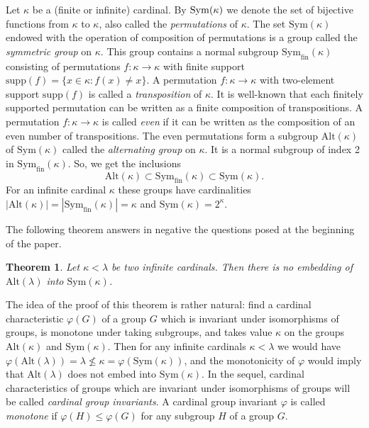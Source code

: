 \documentclass[11pt, twoside]{amsart}
\newtheorem{theorem}{Theorem}
\theoremstyle{definition}
\begin{document}
Let $\kappa$ be a (finite or infinite) cardinal. By ${\rm Sym}(\kappa)$ we denote the set of
bijective functions from $\kappa$ to $\kappa$,
also called the {\em permutations} of $\kappa$.  The set ${\mathrm{Sym}}(\kappa)$ endowed with the operation of composition of permutations is a group called the {\em symmetric group} on $\kappa$. This group contains a normal subgroup ${\mathrm{Sym}}_{\mathrm{fin}}(\kappa)$ consisting of permutations $f:\kappa\to\kappa$ with finite support ${\mathrm{supp}}(f)=\{x\in\kappa:f(x)\ne x\}$. A permutation $f:\kappa\to\kappa$ with two-element support ${\mathrm{supp}}(f)$ is called a {\em transposition} of $\kappa$. It is well-known that each finitely supported permutation can be written as a finite composition of transpositions. A permutation $f:\kappa\to\kappa$ is called {\em even} if it can be written as the composition of an even number of transpositions. The even permutations form a subgroup ${\mathrm{Alt}}(\kappa)$ of ${\mathrm{Sym}}(\kappa)$ called the {\em alternating group} on $\kappa$. It is a normal subgroup of index 2 in ${\mathrm{Sym}}_{\mathrm{fin}}(\kappa)$. So, we get the inclusions $${\mathrm{Alt}}(\kappa)\subset{\mathrm{Sym}}_{\mathrm{fin}}(\kappa)\subset{\mathrm{Sym}}(\kappa).$$
For an infinite cardinal $\kappa$ these groups have cardinalities $|{\mathrm{Alt}}(\kappa)|=|{\mathrm{Sym}}_{\mathrm{fin}}(\kappa)|=\kappa$ and ${\mathrm{Sym}}(\kappa)=2^\kappa$.

The following theorem answers in negative the questions posed at the beginning of the paper.

\begin{theorem}\label{t1}
Let $\kappa <\lambda$ be two infinite cardinals. Then
there is no embedding
of ${\mathrm{Alt}}(\lambda)$
into ${\mathrm{Sym}}(\kappa)$.
\end{theorem}

The idea of the proof of this theorem is rather natural: find a cardinal characteristic $\varphi(G)$ of a group $G$ which is invariant under isomorphisms of groups, is monotone under taking subgroups, and takes value $\kappa$ on the groups ${\mathrm{Alt}}(\kappa)$ and ${\mathrm{Sym}}(\kappa)$. Then for any infinite cardinals $\kappa<\lambda$ we would have $\varphi({\mathrm{Alt}}(\lambda))=\lambda\not\le \kappa=\varphi({\mathrm{Sym}}(\kappa))$, and the monotonicity of $\varphi$ would imply that ${\mathrm{Alt}}(\lambda)$ does not embed into ${\mathrm{Sym}}(\kappa)$. In the sequel, cardinal characteristics of groups which are invariant under isomorphisms of groups will be called {\em cardinal group invariants}. A cardinal group invariant $\varphi$ is called {\em monotone} if $\varphi(H)\le\varphi(G)$ for any subgroup $H$ of a group $G$.
\end{document}
